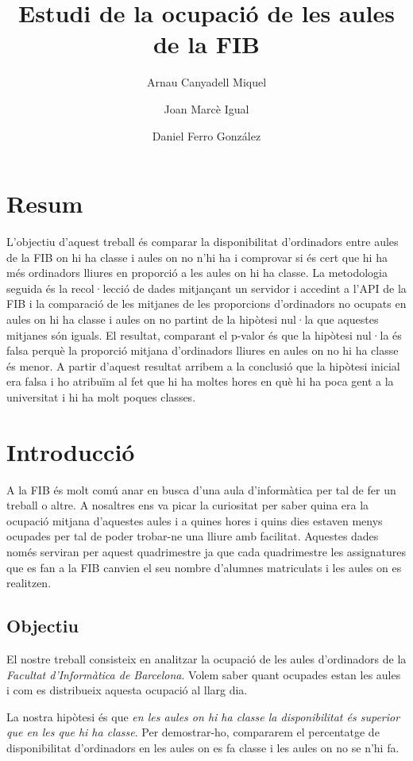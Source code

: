 \documentclass[a4paper, 12pt]{article}
\begin{document}
\title{Estudi de la ocupació de les aules de la FIB}
\author{Arnau Canyadell Miquel \and Joan Marcè Igual \and Daniel Ferro González}

\maketitle
\newpage
\tableofcontents

\newpage
\section{Resum}


L'objectiu d'aquest treball és comparar la disponibilitat d'ordinadors entre aules de la FIB on hi ha classe i aules on no n'hi ha i comprovar si és cert que hi ha més ordinadors lliures en proporció a les aules on hi ha classe.
La metodologia seguida és la recol·lecció de dades mitjançant un servidor i accedint a l'API de la FIB i la comparació de les mitjanes de les proporcions d'ordinadors no ocupats en aules on hi ha classe i aules on no partint de la hipòtesi nul·la que aquestes mitjanes són iguals.
El resultat, comparant el p-valor és que la hipòtesi nul·la és falsa perquè la proporció mitjana d'ordinadors lliures en aules on no hi ha classe és menor.
A partir d'aquest resultat arribem a la conclusió que la hipòtesi inicial era falsa i ho atribuïm al fet que hi ha moltes hores en què hi ha poca gent a la universitat i hi ha molt poques classes.

\section{Introducció}

A la FIB és molt comú anar en busca d'una aula d'informàtica per tal de fer un treball o altre. A nosaltres ens va picar la curiositat per saber quina era la ocupació mitjana d'aquestes aules i a quines hores i quins dies estaven menys ocupades per tal de poder trobar-ne una lliure amb facilitat. Aquestes dades només serviran per aquest quadrimestre ja que cada quadrimestre les assignatures que es fan a la FIB canvien el seu nombre d'alumnes matriculats i les aules on es realitzen.

\subsection{Objectiu}

El nostre treball consisteix en analitzar la ocupació de les aules d'ordinadors de la \emph{Facultat d'Informàtica de Barcelona}. Volem saber quant ocupades estan les aules i com es distribueix aquesta ocupació al llarg dia.

La nostra hipòtesi és que \emph{en les aules on hi ha classe la disponibilitat és superior que en les que hi ha classe}. Per demostrar-ho, compararem el percentatge de disponibilitat d'ordinadors en les aules on es fa classe i les aules on no se n'hi fa.






\end{document}
